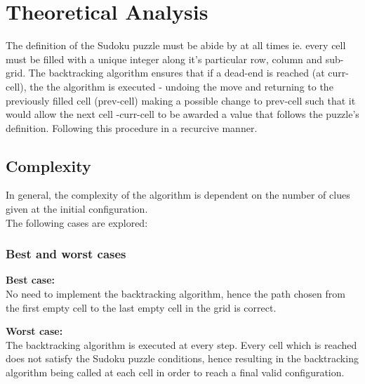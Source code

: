 \documentclass[12pt]{article}
\begin{document}
\section{Theoretical Analysis}
\begin{flushleft}
The definition of the Sudoku puzzle must be abide by at all times ie. every cell must be filled with a unique integer along it's particular row, column and sub-grid.  The backtracking algorithm ensures that if a dead-end is reached (at curr-cell), the the algorithm is executed - undoing the move and returning to the previously filled cell (prev-cell) making a possible change to prev-cell such that it would allow the next cell -curr-cell to be awarded a value that follows the puzzle's definition. Following this procedure in a recurcive manner.
\end{flushleft}
\subsection{Complexity}
\begin{flushleft}
In general, the complexity of the algorithm is dependent on the number of clues given at the initial configuration. \\
The following cases are explored:
\end{flushleft}

\subsubsection{Best and worst cases}
\begin{flushleft}
\textbf{Best case:}\\
No need to implement the backtracking algorithm, hence the path chosen from the first empty cell to the last empty cell in the grid is correct. 
\end{flushleft}
\begin{flushleft}
\textbf{Worst case:}\\
The backtracking algorithm is executed at every step. Every cell which is reached does not satisfy the Sudoku puzzle conditions, hence resulting in the backtracking algorithm being called at each cell in order to reach a final valid configuration.  
\end{flushleft}
\end{document}
